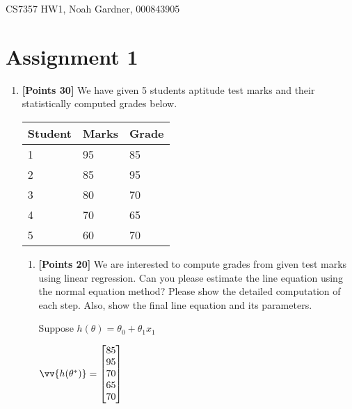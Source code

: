 \documentclass[12pt]{article}
\begin{document}
CS7357 HW1, Noah Gardner, 000843905\newline

\section{Assignment 1}
\begin{enumerate}
    \item \textbf{[Points 30]} We have given 5 students aptitude test marks and their
          statistically computed grades below.

          \begin{table}[h]
              \centering
              \begin{tabular}{|l|l|l|}
                  \hline
                  Student & Marks & Grade \\
                  \hline
                  1       & 95    & 85    \\
                  \hline
                  2       & 85    & 95    \\
                  \hline
                  3       & 80    & 70    \\
                  \hline
                  4       & 70    & 65    \\
                  \hline
                  5       & 60    & 70    \\
                  \hline
              \end{tabular}
          \end{table}
          \begin{enumerate}
              \item \textbf{[Points 20]} We are interested to compute grades from
                    given test marks using linear regression. Can you please
                    estimate the line equation using the normal equation method?
                    Please show the detailed computation of each step.  Also, show
                    the final line equation and its parameters.

                    Suppose $h(\theta) = \theta_0 + \theta_1 x_1$

                    $\vv{h(\theta^*)} = \begin{bmatrix}
                            85 \\
                            95 \\
                            70 \\
                            65 \\
                            70
                        \end{bmatrix} $


\end{enumerate}
\end{enumerate}
\end{document}
